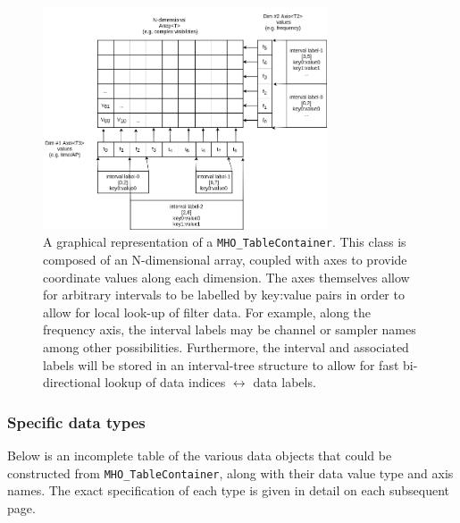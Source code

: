 \begin{figure}[h!]
  \begin{center}
  \captionsetup{width=0.7\linewidth}
  \includegraphics[width=0.75\textwidth]{fig/data-container-baseline.png}
    \caption{A graphical representation of a \texttt{MHO\_TableContainer}. This class is composed of an N-dimensional array, coupled with axes to provide coordinate values along each dimension. The axes themselves allow for arbitrary intervals to be labelled by key:value pairs in order to allow for local look-up of filter data. For example, along the frequency axis, the interval labels may be channel or sampler names among other possibilities. Furthermore, the interval and associated labels will be stored in an interval-tree structure to allow for fast bi-directional lookup of data indices $\leftrightarrow$ data labels.}
    \label{fig:table-container}
\end{center}
\end{figure}

\subsubsection{Specific data types}

Below is an incomplete table of the various data objects that could be constructed from \texttt{MHO\_TableContainer}, along with their data value type and axis names.
The exact specification of each type is given in detail on each subsequent page.

